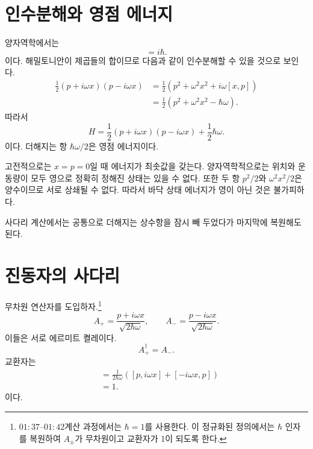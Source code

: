 \section{인수분해와 영점 에너지}

양자역학에서는
\begin{equation}
[x,p]=i\hbar.
\end{equation}
이다. 해밀토니안이 제곱들의 합이므로 다음과 같이 인수분해할 수 있을 것으로 보인다.
\begin{align}
\frac{1}{2}(p+i\omega x)(p-i\omega x)
&=\frac{1}{2}\left(p^2+\omega^2x^2+i\omega[x,p]\right) \\
&=\frac{1}{2}\left(p^2+\omega^2x^2-\hbar\omega\right).
\end{align}
따라서
\begin{equation}
H=\frac{1}{2}(p+i\omega x)(p-i\omega x)
+\frac{1}{2}\hbar\omega.
\end{equation}
이다. 더해지는 항 \(\hbar\omega/2\)은 영점 에너지이다.

고전적으로는 \(x=p=0\)일 때 에너지가 최솟값을 갖는다. 양자역학적으로는 위치와 운동량이 모두 영으로 정확히 정해진 상태는 있을 수 없다. 또한 두 항 \(p^2/2\)와 \(\omega^2x^2/2\)은 양수이므로 서로 상쇄될 수 없다. 따라서 바닥 상태 에너지가 영이 아닌 것은 불가피하다.

사다리 계산에서는 공통으로 더해지는 상수항을 잠시 빼 두었다가 마지막에 복원해도 된다.

\begin{classroomqa}\end{classroomqa}

\section{진동자의 사다리}

무차원 연산자를 도입하자.\footnote{\(01{:}37\)--\(01{:}42\)계산 과정에서는 \(\hbar=1\)를 사용한다. 이 정규화된 정의에서는 \(\hbar\) 인자를 복원하여 \(A_\pm\)가 무차원이고 교환자가 1이 되도록 한다.}
\begin{equation}
A_+=\frac{p+i\omega x}{\sqrt{2\hbar\omega}},
\qquad
A_-=\frac{p-i\omega x}{\sqrt{2\hbar\omega}}.
\end{equation}
이들은 서로 에르미트 켤레이다.
\begin{equation}
A_+^\dagger=A_-.
\end{equation}
교환자는
\begin{align}
[A_-,A_+]
&=\frac{1}{2\hbar\omega}
\left([p,i\omega x]+[-i\omega x,p]\right) \\
&=1.
\end{align}
이다.

